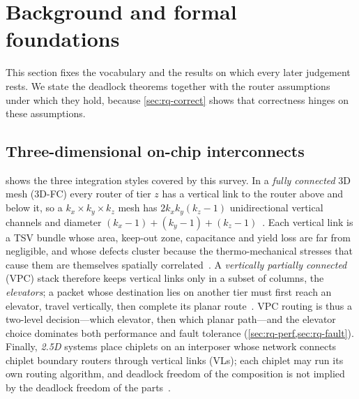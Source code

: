 \section{Background and formal foundations}
\label{sec:background}

This section fixes the vocabulary and the results on which every later judgement rests. We state the deadlock theorems together with the router assumptions under which they hold, because \cref{sec:rq-correct} shows that correctness hinges on these assumptions.

\subsection{Three-dimensional on-chip interconnects}
\label{sec:bg-arch}

 shows the three integration styles covered by this survey. In a \emph{fully connected} 3D mesh (3D-FC) every router of tier $z$ has a vertical link to the router above and below it, so a $k_x\times k_y\times k_z$ mesh has $2k_xk_y(k_z-1)$ unidirectional vertical channels and diameter $(k_x-1)+(k_y-1)+(k_z-1)$~\cite{pavlidis2007topologies}. Each vertical link is a TSV bundle whose area, keep-out zone, capacitance and yield loss are far from negligible, and whose defects cluster because the thermo-mechanical stresses that cause them are themselves spatially correlated~\cite{dang2021hotcluster,wang2015clustering,jiang2013tsvrepair}. A \emph{vertically partially connected} (VPC) stack therefore keeps vertical links only in a subset of columns, the \emph{elevators}; a packet whose destination lies on another tier must first reach an elevator, travel vertically, then complete its planar route~\cite{dubois2013elevator,charif2018firstlast}. VPC routing is thus a two-level decision---which elevator, then which planar path---and the elevator choice dominates both performance and fault tolerance (\cref{sec:rq-perf,sec:rq-fault}). Finally, \emph{2.5D} systems place chiplets on an interposer whose network connects chiplet boundary routers through vertical links (VLs); each chiplet may run its own routing algorithm, and deadlock freedom of the composition is not implied by the deadlock freedom of the parts~\cite{yin2018modular,majumder2021remote,taheri2022deft}.

